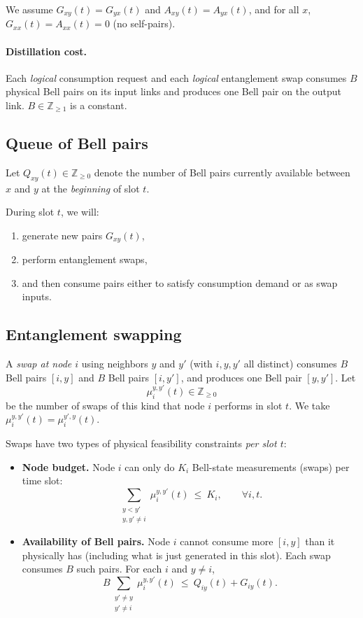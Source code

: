 \documentclass[11pt]{article}
\begin{document}
We assume $G_{xy}(t)=G_{yx}(t)$ and $A_{xy}(t)=A_{yx}(t)$, and for all $x$, $G_{xx}(t)=A_{xx}(t)=0$ (no self-pairs).

\paragraph{Distillation cost.}

Each \emph{logical} consumption request and each \emph{logical} entanglement swap consumes $B$ physical Bell pairs on its input links and produces one Bell pair on the output link. $B\in\mathbb{Z}_{\ge 1}$ is a constant.

\subsection{Queue of Bell pairs}

Let $Q_{xy}(t)\in\mathbb{Z}_{\ge 0}$ denote the number of Bell pairs currently available between $x$ and $y$ at the \emph{beginning} of slot $t$. 

During slot $t$, we will:
\begin{enumerate}[leftmargin=2em,label=(\alph*)]
\item generate new pairs $G_{xy}(t)$,
\item perform entanglement swaps,
\item and then consume pairs either to satisfy consumption demand or as swap inputs.
\end{enumerate}

\subsection{Entanglement swapping}

A \emph{swap at node $i$} using neighbors $y$ and $y'$ (with $i,y,y'$ all distinct) consumes $B$ Bell pairs $[i,y]$ and $B$ Bell pairs $[i,y']$, and produces one Bell pair $[y,y']$. Let
\[
\mu_i^{y,y'}(t)\in\mathbb{Z}_{\ge 0}
\]
be the number of swaps of this kind that node $i$ performs in slot $t$. We take $\mu_i^{y,y'}(t)=\mu_i^{y',y}(t)$.

Swaps have two types of physical feasibility constraints \emph{per slot $t$}:
\begin{itemize}[leftmargin=2em]
\item \textbf{Node budget.} Node $i$ can only do $K_i$ Bell-state measurements (swaps) per time slot:
\begin{equation}
\sum_{\substack{y<y'\\ y,y'\neq i}}\mu_i^{y,y'}(t)\ \le\ K_i,
\qquad \forall i,t.
\label{eq:cap-phys}
\end{equation}

\item \textbf{Availability of Bell pairs.} Node $i$ cannot consume more $[i,y]$ than it physically has (including what is just generated in this slot). Each swap consumes $B$ such pairs. For each $i$ and $y\neq i$,
\begin{equation}
B\sum_{\substack{y'\neq y\\ y'\neq i}}\mu_i^{y,y'}(t)
\ \le\ Q_{iy}(t)+G_{iy}(t).
\label{eq:avail-phys}
\end{equation}
\end{itemize}
\end{document}
